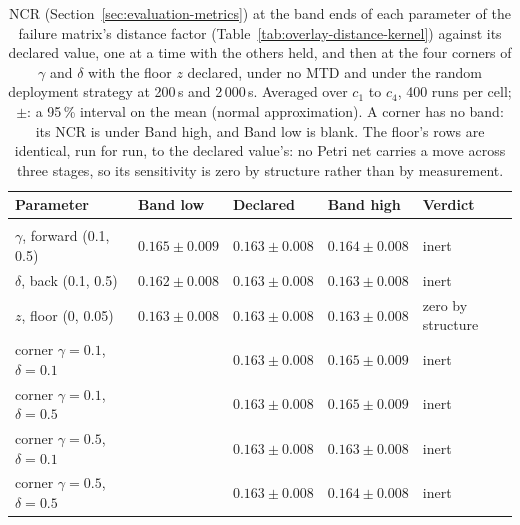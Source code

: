 
\begin{table}[htbp]
\centering\footnotesize
\caption[NCR across the parameters of the failure matrix's distance factor]{NCR (Section~\ref{sec:evaluation-metrics}) at the band ends of each parameter of the failure matrix's distance factor (Table~\ref{tab:overlay-distance-kernel}) against its declared value, one at a time with the others held, and then at the four corners of $\gamma$ and $\delta$ with the floor $z$ declared, under no MTD and under the random deployment strategy at 200\,s and 2\,000\,s. Averaged over $c_1$ to $c_4$, 400 runs per cell; $\pm$: a 95\,\% interval on the mean (normal approximation). A corner has no band: its NCR is under Band high, and Band low is blank. The floor's rows are identical, run for run, to the declared value's: no Petri net carries a move across three stages, so its sensitivity is zero by structure rather than by measurement.}
\label{tab:decay-sensitivity}
\tablestyle\setlength{\tabcolsep}{4pt}
\begin{tabular}{@{}P{4.4cm}>{\centering\arraybackslash}p{2.2cm}>{\centering\arraybackslash}p{2.2cm}>{\centering\arraybackslash}p{2.2cm}P{2.8cm}@{}}
\toprule
Parameter & Band low & Declared & Band high & Verdict \\
\midrule
{} \\
$\gamma$, forward (0.1, 0.5) & $0.165 \pm 0.009$ & $0.163 \pm 0.008$ & $0.164 \pm 0.008$ & inert \\
$\delta$, back (0.1, 0.5) & $0.162 \pm 0.008$ & $0.163 \pm 0.008$ & $0.163 \pm 0.008$ & inert \\
$z$, floor (0, 0.05) & $0.163 \pm 0.008$ & $0.163 \pm 0.008$ & $0.163 \pm 0.008$ & zero by structure \\
corner $\gamma=0.1$, $\delta=0.1$ &  & $0.163 \pm 0.008$ & $0.165 \pm 0.009$ & inert \\
corner $\gamma=0.1$, $\delta=0.5$ &  & $0.163 \pm 0.008$ & $0.165 \pm 0.009$ & inert \\
corner $\gamma=0.5$, $\delta=0.1$ &  & $0.163 \pm 0.008$ & $0.163 \pm 0.008$ & inert \\
corner $\gamma=0.5$, $\delta=0.5$ &  & $0.163 \pm 0.008$ & $0.164 \pm 0.008$ & inert \\

\end{tabular}
\end{table}
